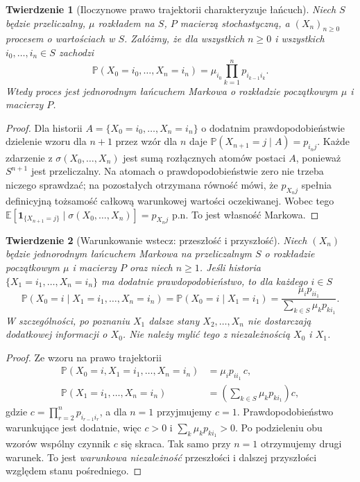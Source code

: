 \documentclass[11pt,a4paper,oneside]{report}
\numberwithin{equation}{chapter}
\theoremstyle{plain}
\newtheorem{twierdzenie}{Twierdzenie}[chapter]
\theoremstyle{definition}
\theoremstyle{remark}
\newcommand{\Prob}{\mathbb{P}}
\newcommand{\E}{\mathbb{E}}
\newcommand{\ind}[1]{\mathbf{1}_{#1}}
\begin{document}
\begin{twierdzenie}[Iloczynowe prawo trajektorii charakteryzuje łańcuch]
Niech $S$ będzie przeliczalny, $\mu$ rozkładem na $S$,
$P$ macierzą stochastyczną, a $(X_n)_{n\geq0}$ procesem
o wartościach w $S$. Załóżmy, że dla wszystkich $n\geq0$
i wszystkich $i_0,\ldots,i_n\in S$ zachodzi
\[
\Prob(X_0=i_0,\ldots,X_n=i_n)
=\mu_{i_0}\prod_{k=1}^np_{i_{k-1}i_k}.
\]
Wtedy proces jest jednorodnym łańcuchem Markowa
o rozkładzie początkowym $\mu$ i macierzy $P$.
\end{twierdzenie}
\begin{proof}
Dla historii $A=\{X_0=i_0,\ldots,X_n=i_n\}$
o dodatnim prawdopodobieństwie dzielenie wzoru
dla $n+1$ przez wzór dla $n$ daje
$\Prob(X_{n+1}=j\mid A)=p_{i_nj}$.
Każde zdarzenie z $\sigma(X_0,\ldots,X_n)$
jest sumą rozłącznych atomów postaci $A$,
ponieważ $S^{n+1}$ jest przeliczalny.
Na atomach o prawdopodobieństwie zero nie trzeba
niczego sprawdzać; na pozostałych otrzymana
równość mówi, że $p_{X_nj}$ spełnia definicyjną
tożsamość całkową warunkowej wartości oczekiwanej.
Wobec tego
$\E[\ind{\{X_{n+1}=j\}}\mid
\sigma(X_0,\ldots,X_n)]=p_{X_nj}$ p.n.
To jest własność Markowa.
\end{proof}

\begin{twierdzenie}[Warunkowanie wstecz: przeszłość i przyszłość]
Niech $(X_n)$ będzie jednorodnym łańcuchem Markowa
na przeliczalnym $S$ o rozkładzie początkowym
$\mu$ i macierzy $P$ oraz niech $n\geq1$.
Jeśli historia $\{X_1=i_1,\ldots,X_n=i_n\}$
ma dodatnie prawdopodobieństwo, to dla każdego $i\in S$
\[
\Prob(X_0=i\mid X_1=i_1,\ldots,X_n=i_n)
=\Prob(X_0=i\mid X_1=i_1)
=\frac{\mu_i p_{ii_1}}{\sum_{k\in S}\mu_kp_{ki_1}}.
\]
W szczególności, po poznaniu $X_1$ dalsze stany
$X_2,\ldots,X_n$ nie dostarczają dodatkowej informacji
o $X_0$. Nie należy mylić tego z niezależnością
$X_0$ i $X_1$.
\end{twierdzenie}
\begin{proof}
Ze wzoru na prawo trajektorii
\begin{align*}
\Prob(X_0=i, X_1=i_1,\ldots,X_n=i_n)
&=\mu_i p_{ii_1}\,c,\\
\Prob(X_1=i_1,\ldots,X_n=i_n)
&=\left(\sum_{k\in S}\mu_kp_{ki_1}\right)c,
\end{align*}
gdzie $c=\prod_{r=2}^np_{i_{r-1}i_r}$,
a dla $n=1$ przyjmujemy $c=1$. Prawdopodobieństwo
warunkujące jest dodatnie, więc $c>0$ i
$\sum_k\mu_kp_{ki_1}>0$. Po podzieleniu
obu wzorów wspólny czynnik $c$ się skraca.
Tak samo przy $n=1$ otrzymujemy drugi warunek.
To jest \emph{warunkowa niezależność} przeszłości
i dalszej przyszłości względem stanu pośredniego.
\end{proof}
\end{document}
